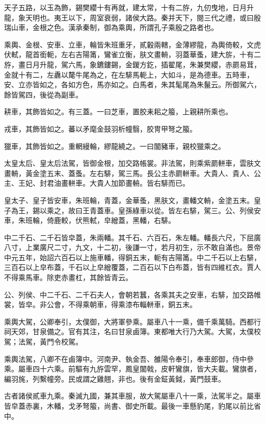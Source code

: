 \begin{pinyinscope}
天子五路，以玉為飾，錫樊纓十有再就，建太常，十有二斿，九仞曳地，日月升龍，象天明也。夷王以下，周室衰弱，諸侯大路。秦并天下，閱三代之禮，或曰殷瑞山車，金根之色。漢承秦制，御為乘輿，所謂孔子乘殷之路者也。

乘輿、金根、安車、立車，輪皆朱班重牙，貳轂兩轄，金薄繆龍，為輿倚較，文虎伏軾，龍首銜軛，左右吉陽筩，鸞雀立衡，肤文畫輈，羽蓋華蚤，建大旂，十有二斿，畫日月升龍，駕六馬，象鑣鏤錫，金鍐方釳，插翟尾，朱兼樊纓，赤罽易茸，金就十有二，左纛以氂牛尾為之，在左騑馬軛上，大如斗，是為德車。五時車，安、立亦皆如之，各如方色，馬亦如之。白馬者，朱其髦尾為朱鬣云。所御駕六，餘皆駕四，後從為副車。

耕車，其飾皆如之。有三蓋。一曰芝車，置胶耒耜之箙，上親耕所乘也。

戎車，其飾皆如之。蕃以矛麾金鼓羽析幢翳，胶冑甲弩之箙。

獵車，其飾皆如之。重輞縵輪，繆龍繞之。一曰闟豬車，親校獵乘之。

太皇太后、皇太后法駕，皆御金根，加交路帳裳。非法駕，則乘紫罽軿車，雲肤文畫輈，黃金塗五末、蓋蚤。左右騑，駕三馬。長公主赤罽軿車。大貴人、貴人、公主、王妃、封君油畫軿車。大貴人加節畫輈。皆右騑而已。

皇太子、皇子皆安車，朱班輪，青蓋，金華蚤，黑肤文，畫轓文輈，金塗五末。皇子為王，錫以乘之，故曰王青蓋車。皇孫綠車以從。皆左右騑，駕三。公、列侯安車，朱班輪，倚鹿較，伏熊軾，皁繒蓋，黑轓，右騑。

中二千石、二千石皆皁蓋，朱兩轓。其千石、六百石，朱左轓。轓長六尺，下屈廣八寸，上業廣尺二寸，九文，十二初，後謙一寸，若月初生，示不敢自滿也。景帝中元五年，始詔六百石以上施車轓，得銅五末，軛有吉陽筩。中二千石以上右騑，三百石以上皁布蓋，千石以上皁繒覆蓋，二百石以下白布蓋，皆有四維杠衣。賈人不得乘馬車。除吏赤畫杠，其餘皆青云。

公、列侯、中二千石、二千石夫人，會朝若蠶，各乘其夫之安車，右騑，加交路帷裳，皆皁。非公會，不得乘朝車，得乘漆布輜軿車，銅五末。

乘輿大駕，公卿奉引，太僕御，大將軍參乘。屬車八十一乘，備千乘萬騎。西都行祠天郊，甘泉備之。官有其注，名曰甘泉鹵簿。東都唯大行乃大駕。大駕，太僕校駕；法駕，黃門令校駕。

乘輿法駕，八卿不在鹵簿中。河南尹、執金吾、雒陽令奉引，奉車郎御，侍中參乘。屬車四十六乘。前驅有九斿雲罕，鳳皇闟戟，皮軒鸞旗，皆大夫載。鸞旗者，編羽旄，列繫幢旁。民或謂之雞翹，非也。後有金鉦黃鉞，黃門鼓車。

古者諸侯貳車九乘。秦滅九國，兼其車服，故大駕屬車八十一乘，法駕半之。屬車皆皁蓋赤裏，木轓，戈矛弩箙，尚書、御史所載。最後一車懸豹尾，豹尾以前比省中。


\end{pinyinscope}
